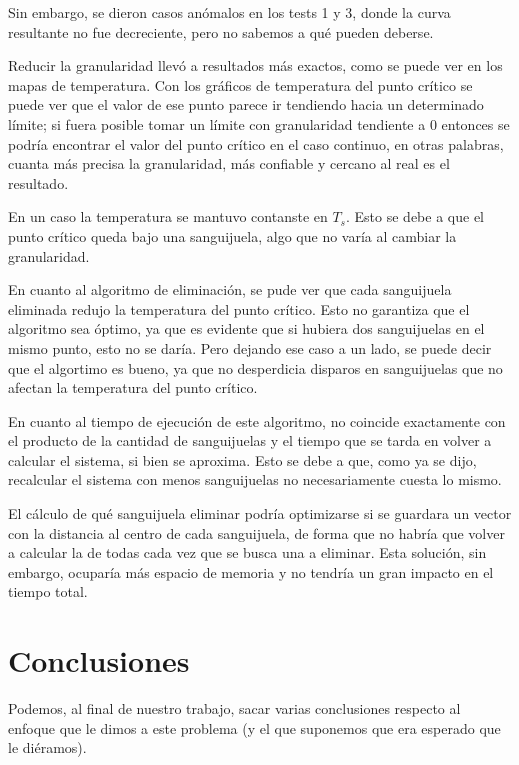 \documentclass[a4paper]{article}
\begin{document}
Sin embargo, se dieron casos anómalos en los tests 1 y 3, donde la curva resultante no fue decreciente, pero no sabemos a qué pueden deberse.

Reducir la granularidad llevó a resultados más exactos, como se puede ver en los mapas de temperatura. Con los gráficos de temperatura del punto crítico se puede ver que el valor de ese punto parece ir tendiendo hacia un determinado límite; si fuera posible tomar un límite con granularidad tendiente a 0 entonces se podría encontrar el valor del punto crítico en el caso continuo, en otras palabras, cuanta más precisa la granularidad, más confiable y cercano al real es el resultado.

En un caso la temperatura se mantuvo contanste en $T_s$. Esto se debe a que el punto crítico queda bajo una sanguijuela, algo que no varía al cambiar la granularidad.

En cuanto al algoritmo de eliminación, se pude ver que cada sanguijuela eliminada redujo la temperatura del punto crítico. Esto no garantiza que el algoritmo sea óptimo, ya que es evidente que si hubiera dos sanguijuelas en el mismo punto, esto no se daría. Pero dejando ese caso a un lado, se puede decir que el algortimo es bueno, ya que no desperdicia disparos en sanguijuelas que no afectan la temperatura del punto crítico.

En cuanto al tiempo de ejecución de este algoritmo, no coincide exactamente con el producto de la cantidad de sanguijuelas y el tiempo que se tarda en volver a calcular el sistema, si bien se aproxima. Esto se debe a que, como ya se dijo, recalcular el sistema con menos sanguijuelas no necesariamente cuesta lo mismo.

El cálculo de qué sanguijuela eliminar podría optimizarse si se guardara un vector con la distancia al centro de cada sanguijuela, de forma que no habría que volver a calcular la de todas cada vez que se busca una a eliminar. Esta solución, sin embargo, ocuparía más espacio de memoria y no tendría un gran impacto en el tiempo total.


\newpage

\section{Conclusiones}
\label{sec:conclusiones}

Podemos, al final de nuestro trabajo, sacar varias conclusiones respecto al enfoque que le dimos a este problema (y el que suponemos que era esperado que le diéramos).
\end{document}
